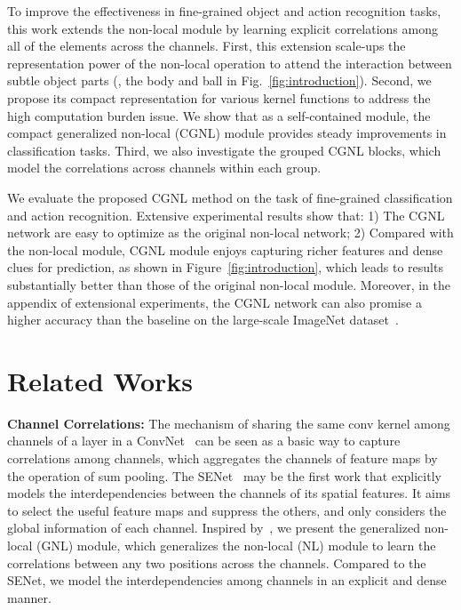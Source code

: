 \documentclass{article}
\begin{document}
To improve the effectiveness in fine-grained object and action recognition tasks, this work extends the non-local module by learning explicit correlations among all of the elements across the channels.
First, this extension scale-ups the representation power of the non-local operation to attend the interaction between subtle object parts (\eg, the body and ball in Fig.~\ref{fig:introduction}).
Second, we propose its compact representation for various kernel functions to address the high computation burden issue.
We show that as a self-contained module, the compact generalized non-local (CGNL) module provides steady improvements in classification tasks.
Third, we also investigate the grouped CGNL blocks, which model the correlations across channels within each group.

We evaluate the proposed CGNL method on the task of fine-grained classification and action recognition.
Extensive experimental results show that:
1) The CGNL network are easy to optimize as the original non-local network;
2) Compared with the non-local module, CGNL module enjoys capturing richer features and dense clues for prediction, as shown in Figure~\ref{fig:introduction}, which leads to results substantially better than those of the original non-local module.
Moreover, in the appendix of extensional experiments, the CGNL network can also promise a higher accuracy than the baseline on the large-scale ImageNet dataset~\cite{imagenet}.
%
%
\section{Related Works}
\textbf{Channel Correlations:}
The mechanism of sharing the same conv kernel among channels of a layer in a ConvNet~\cite{lenet-5} can be seen as a basic way to capture correlations among channels, which aggregates the channels of feature maps by the operation of sum pooling.
The SENet~\cite{senet} may be the first work that explicitly models the interdependencies between the channels of its spatial features.
It aims to select the useful feature maps and suppress the others, and only considers the global information of each channel.
Inspired by~\cite{non-local}, we present the generalized non-local (GNL) module, which generalizes the non-local (NL) module to learn the correlations between any two positions across the channels.
Compared to the SENet, we model the interdependencies among channels in an explicit and dense manner.
\end{document}
